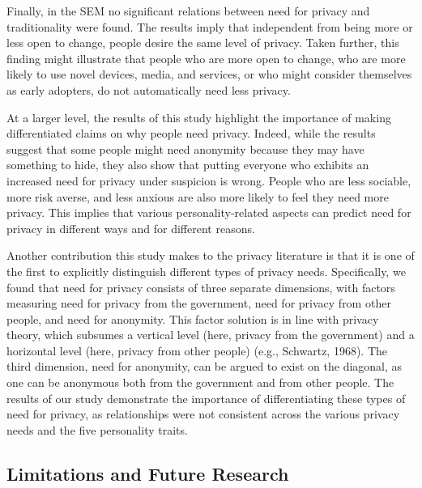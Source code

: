 \documentclass[man,floatsintext]{apa6}
\begin{document}
Finally, in the SEM no significant relations between need for privacy and traditionality were found. The results imply that independent from being more or less open to change, people desire the same level of privacy. Taken further, this finding might illustrate that people who are more open to change, who are more likely to use novel devices, media, and services, or who might consider themselves as early adopters, do not automatically need less privacy.

At a larger level, the results of this study highlight the importance of making differentiated claims on why people need privacy. Indeed, while the results suggest that some people might need anonymity because they may have something to hide, they also show that putting everyone who exhibits an increased need for privacy under suspicion is wrong. People who are less sociable, more risk averse, and less anxious are also more likely to feel they need more privacy. This implies that various personality-related aspects can predict need for privacy in different ways and for different reasons.

Another contribution this study makes to the privacy literature is that it is one of the first to explicitly distinguish different types of privacy needs. Specifically, we found that need for privacy consists of three separate dimensions, with factors measuring need for privacy from the government, need for privacy from other people, and need for anonymity. This factor solution is in line with privacy theory, which subsumes a vertical level (here, privacy from the government) and a horizontal level (here, privacy from other people) (e.g., Schwartz, 1968). The third dimension, need for anonymity, can be argued to exist on the diagonal, as one can be anonymous both from the government and from other people. The results of our study demonstrate the importance of differentiating these types of need for privacy, as relationships were not consistent across the various privacy needs and the five personality traits.

\hypertarget{limitations-and-future-research}{%
\subsection{Limitations and Future Research}\label{limitations-and-future-research}}
\end{document}
